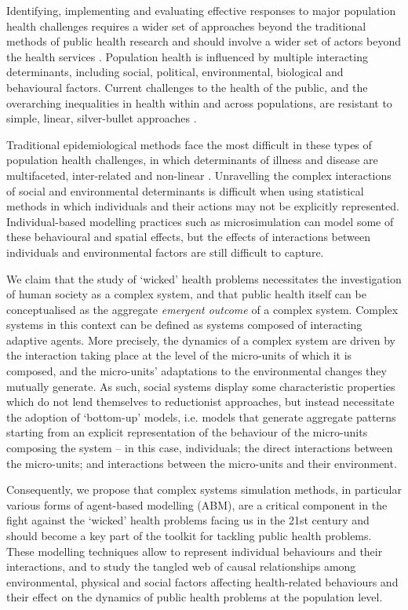 \documentclass[review]{elsarticle}
\begin{document}
Identifying, implementing and evaluating effective responses to major population health challenges requires a wider set of approaches beyond the traditional methods of public health research and should involve a wider set of actors beyond the health services \citep{academy2016}. Population health is influenced by multiple interacting determinants, including social, political, environmental, biological and behavioural factors. Current challenges to the health of the public, and the overarching inequalities in health within and across populations, are resistant to simple, linear, silver-bullet approaches \citep{rutter2017}.

Traditional epidemiological methods face the most difficult in these types of population health challenges, in which determinants of illness and disease are multifaceted, inter-related and non-linear \citep{galea2010}.  Unravelling the complex interactions of social and environmental determinants is difficult when using statistical methods in which individuals and their actions may not be explicitly represented.  Individual-based modelling practices such as microsimulation can model some of these behavioural and spatial effects, but the effects of interactions between individuals and environmental factors are still difficult to capture.

We claim that the study of `wicked' health problems necessitates the investigation of human society as a complex system, and that public health itself can be conceptualised as the aggregate \emph{emergent outcome} of a complex system. Complex systems in this context can be defined as systems composed of interacting adaptive agents. More precisely, the dynamics of a complex system are driven by the interaction taking place at the level of the micro-units of which it is composed, and the micro-units' adaptations to the environmental changes they mutually generate. As such, social systems display some characteristic properties which do not lend themselves to reductionist approaches, but instead necessitate the adoption of `bottom-up' models, i.e. models that generate aggregate patterns starting from an explicit representation of the behaviour of the micro-units composing the system -- in this case, individuals; the direct interactions between the micro-units; and interactions between the micro-units and their environment. 

Consequently, we propose that complex systems simulation methods, in particular various forms of agent-based modelling (ABM), are a critical component in the fight against the `wicked' health problems facing us in the 21st century and should become a key part of the toolkit for tackling public health problems. These modelling techniques allow to represent individual behaviours and their interactions, and to study the tangled web of causal relationships among environmental, physical and social factors affecting health-related behaviours and their effect on the dynamics of public health problems at the population level.
\end{document}
